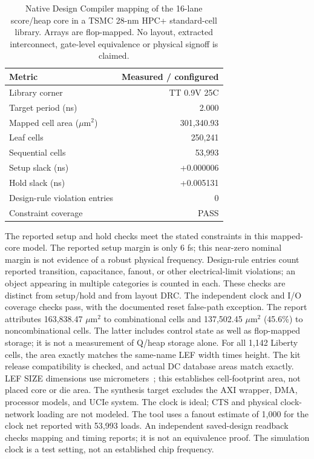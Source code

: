 \begin{table}[t]
\centering\caption{Native Design Compiler mapping of the 16-lane score/heap core in a TSMC 28-nm HPC+ standard-cell library. Arrays are flop-mapped. No layout, extracted interconnect, gate-level equivalence or physical signoff is claimed.}
\label{tab:synthesis}
\small
\begin{tabular}{lr}\toprule
Metric & Measured / configured\\\midrule
Library corner & TT 0.9V 25C\\
Target period (ns) & 2.000\\
Mapped cell area ($\mu$m$^2$) & 301,340.93\\
Leaf cells & 250,241\\
Sequential cells & 53,993\\
Setup slack (ns) & +0.000006\\
Hold slack (ns) & +0.005131\\
Design-rule violation entries & 0\\
Constraint coverage & PASS\\
\bottomrule\end{tabular}
\end{table}
The reported setup and hold checks meet the stated constraints in this mapped-core model. The reported setup margin is only 6 fs; this near-zero nominal margin is not evidence of a robust physical frequency. Design-rule entries count reported transition, capacitance, fanout, or other electrical-limit violations; an object appearing in multiple categories is counted in each. These checks are distinct from setup/hold and from layout DRC. The independent clock and I/O coverage checks pass, with the documented reset false-path exception. The report attributes 163,838.47 $\mu$m$^2$ to combinational cells and 137,502.45 $\mu$m$^2$ (45.6\%) to noncombinational cells. The latter includes control state as well as flop-mapped storage; it is not a measurement of Q/heap storage alone. For all 1,142 Liberty cells, the area exactly matches the same-name LEF width times height. The kit release compatibility is checked, and actual DC database areas match exactly. LEF SIZE dimensions use micrometers~\cite{lefdef}; this establishes cell-footprint area, not placed core or die area. The synthesis target excludes the AXI wrapper, DMA, processor models, and UCIe system. The clock is ideal; CTS and physical clock-network loading are not modeled. The tool uses a fanout estimate of 1,000 for the clock net reported with 53,993 loads. An independent saved-design readback checks mapping and timing reports; it is not an equivalence proof. The simulation clock is a test setting, not an established chip frequency.
